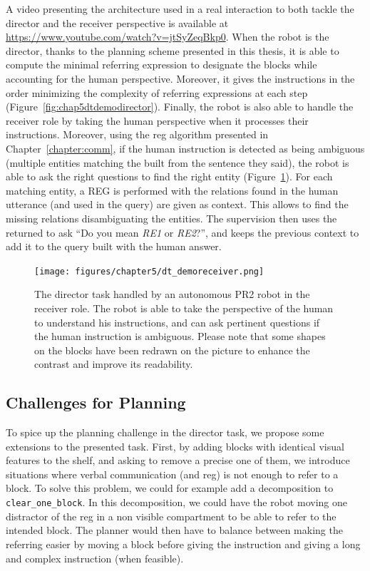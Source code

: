 \documentclass[a4paper,11pt,twoside]{StyleThese}
\begin{document}
A video presenting the architecture used in a real interaction to both tackle the director and the receiver perspective is available at \url{https://www.youtube.com/watch?v=jtSyZeqBkp0}. When the robot is the director, thanks to the planning scheme presented in this thesis, it is able to compute the minimal referring expression to designate the blocks while accounting for the human perspective. Moreover, it gives the instructions in the order minimizing the complexity of referring expressions at each step (Figure~\ref{fig:chap5dtdemodirector}). Finally, the robot is also able to handle the receiver role by taking the human perspective when it processes their instructions. Moreover, using the \acrshort{reg} algorithm presented in Chapter~\ref{chapter:comm}, if the human instruction is detected as being ambiguous (multiple entities matching the \sparql{} built from the sentence they said), the robot is able to ask the right questions to find the right entity (Figure~\ref{fig:chap5dtdemoreceiver}). For each matching entity, a REG is performed with the relations found in the human utterance (and used in the \sparql{} query) are given as context. This allows to find the missing relations disambiguating the entities. The supervision then uses the  returned to ask ``Do you mean \textit{RE1} or \textit{RE2}?'', and keeps the previous context to add it to the \sparql{} query built with the human answer.

\begin{figure}[hbtp]
\centering
\texttt{[image: figures/chapter5/dt\_demoreceiver.png]}
\caption{The director task handled by an autonomous PR2 robot in the receiver role. The robot is able to take the perspective of the human to understand his instructions, and can ask pertinent questions if the human instruction is ambiguous. Please note that some shapes on the blocks have been redrawn on the picture to enhance the contrast and improve its readability.}
\label{fig:chap5dtdemoreceiver}
\end{figure}

\subsection{Challenges for Planning}
To spice up the planning challenge in the director task, we propose some extensions to the presented task.
First, by adding blocks with identical visual features to the shelf, and asking to remove a precise one of them, we introduce situations where verbal communication (and \acrshort{reg}) is not enough to refer to a block. To solve this problem, we could for example add a decomposition to \verb'clear_one_block'. In this decomposition, we could have the robot moving one distractor of the \acrshort{reg} in a non visible compartment to be able to refer to the intended block. The planner would then have to balance between making the referring easier by moving a block before giving the instruction and giving a long and complex instruction (when feasible).
\end{document}
